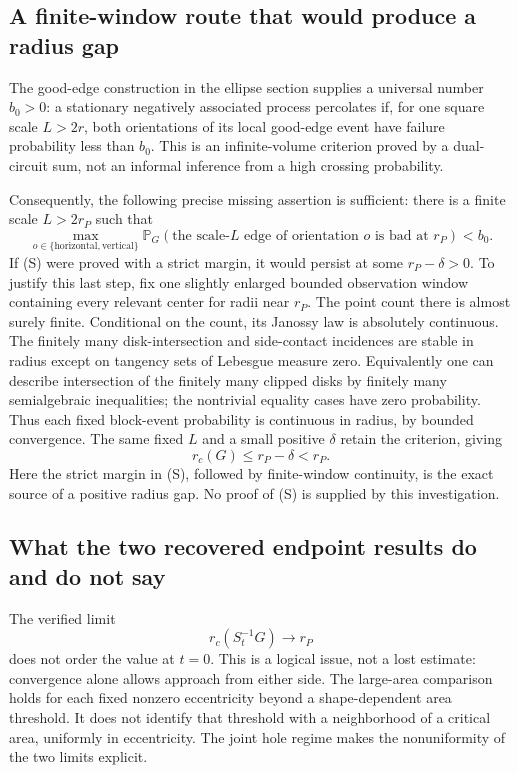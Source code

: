 \documentclass[11pt,a4paper]{article}
\theoremstyle{definition}
\theoremstyle{remark}
\numberwithin{equation}{section}
\begin{document}
\subsection{A finite-window route that would produce a radius gap}
The good-edge construction in the ellipse section supplies a universal
number \(b_0>0\): a stationary negatively associated process percolates
if, for one square scale \(L>2r\), both orientations of its local good-edge
event have failure probability less than \(b_0\). This is an
infinite-volume criterion proved by a dual-circuit sum, not an informal
inference from a high crossing probability.

Consequently, the following precise missing assertion is sufficient:
there is a finite scale \(L>2r_P\) such that
\[
 \max_{o\in\{\mathrm{horizontal},\mathrm{vertical}\}}
 \mathbb P_G(\text{the scale-}L\text{ edge of orientation }o
          \text{ is bad at }r_P)<b_0.
 \tag{S}
\]
If (S) were proved with a strict margin, it would persist at some
\(r_P-\delta>0\). To justify this last step, fix one slightly enlarged
bounded observation window containing every relevant center for radii
near \(r_P\). The point count there is almost surely finite. Conditional
on the count, its Janossy law is absolutely continuous. The finitely many
disk-intersection and side-contact incidences are stable in radius except
on tangency sets of Lebesgue measure zero. Equivalently one can describe
intersection of the finitely many clipped disks by finitely many
semialgebraic inequalities; the nontrivial equality cases have zero
probability. Thus each fixed block-event probability is continuous in
radius, by bounded convergence. The same fixed \(L\) and a small positive
\(\delta\) retain the criterion, giving
\[
                 r_c(G)\le r_P-\delta<r_P.
\]
Here the strict margin in (S), followed by finite-window continuity, is
the exact source of a positive radius gap. No proof of (S) is supplied by
this investigation.

\subsection{What the two recovered endpoint results do and do not say}
The verified limit
\[
          r_c(S_t^{-1}G)\longrightarrow r_P
\]
does not order the value at \(t=0\). This is a logical issue, not a lost
estimate: convergence alone allows approach from either side. The
large-area comparison holds for each fixed nonzero eccentricity beyond
a shape-dependent area threshold. It does not identify that threshold
with a neighborhood of a critical area, uniformly in eccentricity.
The joint hole regime makes the nonuniformity of the two limits explicit.
\end{document}
